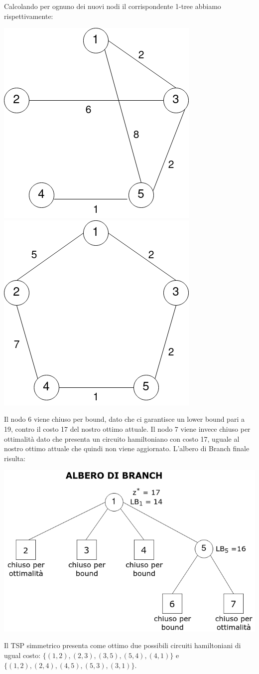 \documentclass[
	article,			%
	12pt,				%
	oneside,			%
	a4paper,			%
	english,			%
	italian,				%
	sumario=tradicional,
	]{abntex2}
\begin{document}
Calcolando per ognuno dei nuovi nodi il corrispondente 1-tree abbiamo rispettivamente:
\begin{center}
    \includegraphics[scale=0.33]{files/sesto1Tree.png}
    \qquad
    \qquad
    \includegraphics[scale=0.33]{files/settimo1Tree.png}
\end{center}
Il nodo 6 viene chiuso per bound, dato che ci garantisce un lower bound pari a 19, contro il costo 17 del nostro ottimo attuale. Il nodo 7 viene invece chiuso per ottimalità dato che presenta un circuito hamiltoniano con costo 17, uguale al nostro ottimo attuale che quindi non viene aggiornato.
\newpage
L'albero di Branch finale risulta:
\begin{center}
    \includegraphics[scale=0.4]{files/alberoBranch3.png}
\end{center}
Il TSP simmetrico presenta come ottimo due possibili circuiti hamiltoniani di ugual costo: $\{(1,2),(2,3),(3,5),(5,4),(4,1)\}$ e $\{(1,2),(2,4),(4,5),(5,3),(3,1)\}$.
\end{document}
